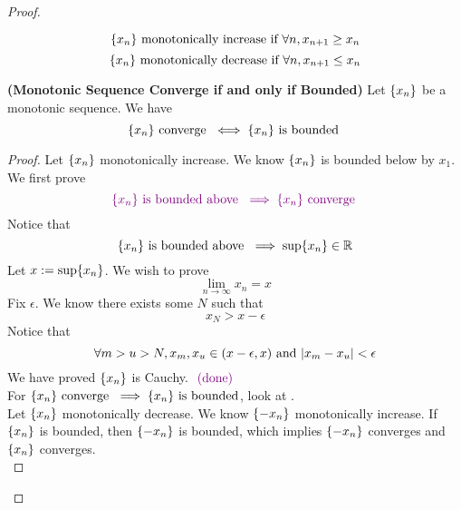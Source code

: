 \documentclass{report}
\begin{document}
\begin{proof}
\begin{definition}
\begin{equation}
\{ x_n \}\text{ monotonically increase if }\forall n, x_{n+1}\geq x_n
\end{equation}
\begin{equation}
\{ x_n \}\text{ monotonically decrease if }\forall n, x_{n+1}\leq x_n
\end{equation}
\end{definition}
\begin{theorem}
\label{4.2.10}
\textbf{(Monotonic Sequence Converge if and only if Bounded)} Let $\{ x_n \}$ be a monotonic sequence. We have
\begin{equation}
\{ x_n \}\text{ converge }\iff \{ x_n \}\text{ is bounded }
\end{equation}
\end{theorem}
\begin{proof}
Let $\{ x_n \}$ monotonically increase. We know $\{ x_n \}$ is bounded below by $x_1$. We first prove
\begin{equation}
  \textcolor{violet}{\{ x_n \}\text{ is bounded above }\implies \{ x_n \}\text{ converge }}
\end{equation}
Notice that
\begin{equation}
\{ x_n \}\text{ is bounded above }\implies \sup \{ x_n \}\in\mathbb{R}
\end{equation}
Let $x:=\sup \{ x_n \}$. We wish to prove
\begin{equation}
\lim_{n\to\infty}x_n=x
\end{equation}
Fix $\epsilon $. We know there exists some $N$ such that
 \begin{equation}
x_N>x-\epsilon 
\end{equation}
Notice that
\begin{equation}
\forall m>u>N, x_m,x_u\in (x-\epsilon ,x)\text{ and }|x_m-x_u|<\epsilon 
\end{equation}
We have proved $\{ x_n \}$ is Cauchy. $\textcolor{violet}{\text{ (done) }}$\\


For $\{ x_n \}\text{ converge }\implies \{ x_n \}\text{ is bounded}$, look at .\\

Let $\{ x_n \}$ monotonically decrease. We know $\{ -x_n \}$ monotonically increase. If $\{ x_n \}$ is bounded, then $\{ -x_n \}$ is bounded, which implies $\{ -x_n \}$ converges and $\{ x_n \}$ converges.\\


\end{proof}
\end{proof}
\end{document}
